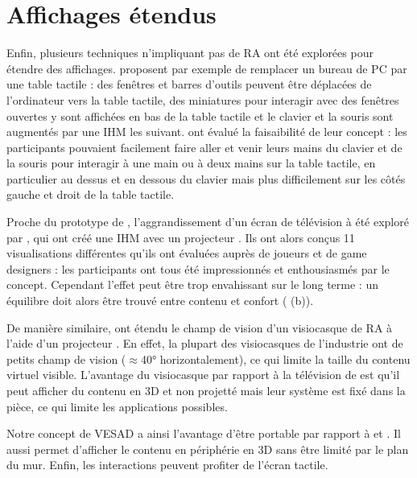 \section{Affichages étendus}
\label{sec:litterature_extended_displays}
Enfin, plusieurs techniques n'impliquant pas de RA ont été explorées pour étendre des affichages. \cite{Bi2011} proposent par exemple de remplacer un bureau de PC par une table tactile  : des fenêtres et barres d'outils peuvent être déplacées de l'ordinateur vers la table tactile, des miniatures pour interagir avec des fenêtres ouvertes y sont affichées en bas de la table tactile et le clavier et la souris sont augmentés par une IHM les suivant. \citeauthor{Bi2011} ont évalué la faisaibilité de leur concept : les participants pouvaient facilement faire aller et venir leurs mains du clavier et de la souris pour interagir à une main ou à deux mains sur la table tactile, en particulier au dessus et en dessous du clavier mais plus difficilement sur les côtés gauche et droit de la table tactile.


Proche du prototype de \cite{Baudisch2002}, l'aggrandissement d'un écran de télévision à été exploré par \cite{Jones2013}, qui ont créé une IHM  avec un projecteur . Ils ont alors conçus 11 visualisations différentes qu'ils ont évaluées auprès de joueurs et de game designers : les participants ont tous été impressionnés et enthousiasmés par le concept. Cependant l'effet peut être trop envahissant sur le long terme : un équilibre doit alors être trouvé entre contenu et confort ( (b)). 

De manière similaire, \cite{Benko2015} ont étendu le champ de vision d'un visiocasque de RA à l'aide d'un projecteur . En effet, la plupart des visiocasques de l'industrie ont de petits champ de vision ($\approx$\ang{40} horizontalement), ce qui limite la taille du contenu virtuel visible. L'avantage du visiocasque par rapport à la télévision de \cite{Jones2013} est qu'il peut afficher du contenu en 3D et non projetté mais leur système est fixé dans la pièce, ce qui limite les applications possibles.

Notre concept de VESAD a ainsi l'avantage d'être portable par rapport à \cite{Jones2013} et \cite{Benko2015}. Il aussi permet d'afficher le contenu en périphérie en 3D sans être limité par le plan du mur. Enfin, les interactions peuvent profiter de l'écran tactile.


